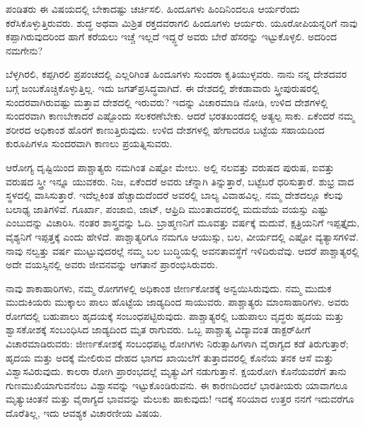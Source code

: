 ಪಂಡಿತರು ಈ ವಿಷಯದಲ್ಲಿ ಬೇಕಾದಷ್ಟು ಚರ್ಚಿಸಲಿ. ಹಿಂದೂಗಳು ಹಿಂದಿನಿಂದಲೂ ಆರ್ಯರೆಂದು ಕರೆಸಿಕೊಳ್ಳುತ್ತಿರುವರು. ಶುದ್ಧ ಅಥವಾ ಮಿಶ್ರಿತ ರಕ್ತದವರಾಗಲಿ ಹಿಂದೂಗಳು ಆರ್ಯರು. ಯೂರೋಪಿಯನ್ನರಿಗೆ ನಾವು ಕಪ್ಪಾಗಿರುವುದರಿಂದ ಹಾಗೆ ಕರೆಯಲು ಇಚ್ಚೆ ಇಲ್ಲದೆ ಇದ್ದ್ಧರೆ ಅವರು ಬೇರೆ ಹೆಸರನ್ನು ಇಟ್ಟುಕೊಳ್ಳಲಿ. ಅದರಿಂದ ನಮಗೇನು?

ಬೆಳ್ಳಗಿರಲಿ, ಕಪ್ಪಗಿರಲಿ ಪ್ರಪಂಚದಲ್ಲಿ ಎಲ್ಲರಿಗಿಂತ ಹಿಂದೂಗಳು ಸುಂದರಾ ಕೃತಿಯುಳ್ಳವರು. ನಾನು ನನ್ನ ದೇಶದವರ ಬಗ್ಗೆ ಜಂಬಕೊಚ್ಚಿಕೊಳ್ಳುತ್ತಿಲ್ಲ. ಇದು ಜಗತ್​ಪ್ರಸಿದ್ಧವಾಗಿದೆ. ಈ ದೇಶದಲ್ಲಿ ಶೇಕಡಾವಾರು ಸ್ತ್ರೀಪುರುಷರಲ್ಲಿ ಸುಂದರವಾಗಿರುವಷ್ಟು ಮತ್ತಾವ ದೇಶದಲ್ಲಿ ಇರುವರು? ಇದನ್ನು ವಿಚಾರಮಾಡಿ ನೋಡಿ, ಉಳಿದ ದೇಶಗಳಲ್ಲಿ ಸುಂದರವಾಗಿ ಕಾಣಬೇಕಾದರೆ ಎಷ್ಟೊಂದು ಸಲಕರಣೆಬೇಕು. ಆದರೆ ಭರತಖಂಡದಲ್ಲಿ ಅತ್ಯಲ್ಪ ಸಾಕು. ಏಕೆಂದರೆ ನಮ್ಮ ಶರೀರದ ಅಧಿಕಾಂಶ ಹೊರಗೆ ಕಾಣುತ್ತಿರುವುದು. ಉಳಿದ ದೇಶಗಳಲ್ಲಿ ಹೇಗಾದರೂ ಬಟ್ಟೆಯ ಸಹಾಯದಿಂದ ಕುರೂಪಿಗಳೂ ಸುಂದರವಾಗಿ ಕಾಣಲು ಪ್ರಯತ್ನಿಸುವರು.

ಆರೋಗ್ಯ ದೃಷ್ಟಿಯಿಂದ ಪಾಶ್ಚಾತ್ಯರು ನಮಗಿಂತ ಎಷ್ಟೋ ಮೇಲು. ಅಲ್ಲಿ ನಲವತ್ತು ವರುಷದ ಪುರುಷ, ಐವತ್ತು ವರುಷದ ಸ್ತ್ರೀ ಇನ್ನೂ ಯುವಕರು. ನಿಜ, ಏಕೆಂದರೆ ಅವರು ಚೆನ್ನಾಗಿ ತಿನ್ನುತ್ತಾರೆ, ಬಟ್ಟೆಬರೆ ಧರಿಸುತ್ತಾರೆ. ಶುಭ್ರ ವಾದ ಸ್ಥಳದಲ್ಲಿ ವಾಸಿಸುತ್ತಾರೆ. ಇದೆಲ್ಲಕಿಂತ ಹೆಚ್ಚಾದುದೆಂದರೆ ಅವರಲ್ಲಿ ಬಾಲ್ಯ ವಿವಾಹವಿಲ್ಲ. ನಮ್ಮ ದೇಶದಲ್ಲೂ ಕೆಲವು ಬಲಾಢ್ಯ ಜಾತಿಗಳಿವೆ. ಗೂರ್ಖಾ, ಪಂಜಾಬಿ, ಜಾಟ್​, ಆಫ್ರಿದಿ ಮುಂತಾದವರಲ್ಲಿ ಮದುವೆಯ ವಯಸ್ಸು ಎಷ್ಟು ಎಂಬುದನ್ನು ವಿಚಾರಿಸಿ. ನಂತರ ಶಾಸ್ತ್ರವನ್ನು ಓದಿ. ಬ್ರಾಹ್ಮಣನಿಗೆ ಮೂವತ್ತು ವರ್ಷಕ್ಕೆ ಮದುವೆ, ಕ್ಷತ್ರಿಯನಿಗೆ ಇಪ್ಪತ್ತೈದು, ವೈಶ್ಯನಿಗೆ ಇಪ್ಪತ್ತಕ್ಕೆ ಎಂದು ಹೇಳಿದೆ. ಪಾಶ್ಚಾತ್ಯರಿಗೂ ನಮಗೂ ಆಯುಸ್ಸು, ಬಲ, ವೀರ್ಯದಲ್ಲಿ ಎಷ್ಟೋ ವ್ಯತ್ಯಾಸಗಳಿವೆ. ನಾವು ನಲ್ವತ್ತು ವರ್ಷ ಮುಟ್ಟುವುದರಲ್ಲೆ ನಮ್ಮ ಬಲ ಬುದ್ಧಿಯಲ್ಲಿ ಅವನತಾವಸ್ಥೆಗೆ ಇಳಿದಿರುವೆವು. ಆದರೆ ಪಾಶ್ಚಾತ್ಯರಲ್ಲಿ ಅದೇ ವಯಸ್ಸಿನಲ್ಲಿ ಅವರು ಜೀವನವನ್ನು ಆಗತಾನೆ ಪ್ರಾರಂಭಿಸಿರುವರು.

ನಾವು ಶಾಕಾಹಾರಿಗಳು, ನಮ್ಮ ರೋಗಗಳಲ್ಲಿ ಅಧಿಕಾಂಶ ಜೀರ್ಣಕೋಶಕ್ಕೆ ಅನ್ವಯಿಸಿರುವುದು. ನಮ್ಮ ಮುದುಕ ಮುದುಕಿಯರು ಮುಕ್ಕಾಲು ಪಾಲು ಹೊಟ್ಟೆಯ ಜಾಡ್ಯದಿಂದ ಸಾಯುವರು. ಪಾಶ್ಚಾತ್ಯರು ಮಾಂಸಾಹಾರಿಗಳು. ಅವರು ರೋಗದಲ್ಲಿ ಬಹುಪಾಲು ಹೃದಯಕ್ಕೆ ಸಂಬಂಧಪಟ್ಟಿರುವುದು. ಪಾಶ್ಚಾತ್ಯರಲ್ಲಿ ಬಹುಪಾಲು ವೃದ್ಧರು ಹೃದಯ ಮತ್ತು ಶ್ವಾಸಕೋಶಕ್ಕೆ ಸಂಬಂಧಿಸಿದ ಜಾಡ್ಯದಿಂದ ಮೃತ ರಾಗುವರು. ಒಬ್ಬ ಪಾಶ್ಚಾತ್ಯ ವಿದ್ಯಾವಂತ ಡಾಕ್ಟರ್​ ಹೀಗೆ ವಿಚಾರಮಾಡಿರುವರು: ಜೀರ್ಣಕೋಶಕ್ಕೆ ಸಂಬಂಧಪಟ್ಟ ರೋಗಿಗಳು ನಿರುತ್ಸಾಹಿಗಳಾಗಿ ವೈರಾಗ್ಯದ ಕಡೆ ತಿರುಗುತ್ತಾರೆ; ಹೃದಯ ಮತ್ತು ಅದಕ್ಕೆ ಮೇಲಿರುವ ದೇಹದ ಭಾಗದ ಖಾಯಿಲೆಗೆ ತುತ್ತಾದವರಲ್ಲಿ ಕೊನೆಯ ತನಕ ಆಸೆ ಮತ್ತು ವಿಶ್ವಾಸವಿರುವುದು. ಕಾಲರಾ ರೋಗಿ ಪ್ರಾರಂಭದಲ್ಲೆ ಮೃತ್ಯುವಿಗೆ ನಡುಗುತ್ತಾನೆ. ಕ್ಷಯರೋಗಿ ಕೊನೆಯವರೆಗೆ ತಾನು ಗುಣಮುಖಿಯಾಗುವನೆಂಬ ವಿಶ್ವಾಸವನ್ನು ಇಟ್ಟುಕೊಂಡಿರುವನು. ಈ ಕಾರಣದಿಂದಲೆ ಭಾರತೀಯರು ಯಾವಾಗಲೂ ಮೃತ್ಯುಚಿಂತನೆ ಮತ್ತು ವೈರಾಗ್ಯದ ಭಾವವನ್ನು ಮೆಲುಕು ಹಾಕುವುದು! ಇದಕ್ಕೆ ಸರಿಯಾದ ಉತ್ತರ ನನಗೆ ಇದುವರೆಗೂ ದೊರೆತಿಲ್ಲ, ಇದು ಆವಶ್ಯಕ ವಿಚಾರಣೀಯ ವಿಷಯ.

